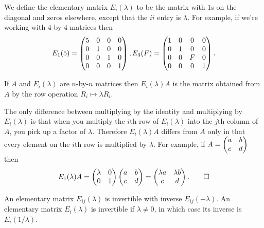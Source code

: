 \documentclass{article}
\begin{document}
\begin{Definition}\label{dfn:elematrix2}
We define the elementary matrix \(E_i(\lambda)\) to be the matrix
with \(1\)s on the diagonal and zeros elsewhere, except that the
\(ii\) entry is \(\lambda\). For example, if we're working with
\(4\)-by-\(4\) matrices then \[E_1(5)=\begin{pmatrix} 5 & 0 & 0 & 0 \\ 0 & 1 & 0
& 0 \\ 0 & 0 & 1 & 0 \\ 0 & 0 & 0 & 1\end{pmatrix}, E_3(F)=\begin{pmatrix} 1 & 0 & 0 & 0
\\ 0 & 1 & 0 & 0 \\ 0 & 0 & F & 0 \\ 0 & 0 & 0 & 1\end{pmatrix}.\]


\end{Definition}
\begin{Lemma}
If \(A\) and \(E_i(\lambda)\) are \(n\)-by-\(n\) matrices then
\(E_i(\lambda)A\) is the matrix obtained from \(A\) by the row
operation \(R_i\mapsto\lambda R_i\).
\end{Lemma}
\begin{Proof}
The only difference between multiplying by the identity and
multiplying by \(E_i(\lambda)\) is that when you multiply the
\(i\)th row of \(E_i(\lambda)\) into the \(j\)th column of \(A\),
you pick up a factor of \(\lambda\). Therefore \(E_i(\lambda)A\)
differs from \(A\) only in that every element on the \(i\)th row is
multiplied by \(\lambda\). For example, if \(A=\begin{pmatrix} a & b \\ c &
d\end{pmatrix}\) then \[E_1(\lambda)A=\begin{pmatrix} \lambda & 0 \\ 0 & 1 \end{pmatrix}\begin{pmatrix} a & b
\\ c & d\end{pmatrix}=\begin{pmatrix} \lambda a & \lambda b \\ c & d\end{pmatrix}.\qedhere\]


\end{Proof}
\begin{Lemma}
An elementary matrix \(E_{ij}(\lambda)\) is invertible with inverse
\(E_{ij}(-\lambda)\). An elementary matrix \(E_i(\lambda)\) is
invertible if \(\lambda\neq 0\), in which case its inverse is
\(E_i(1/\lambda)\).
\end{Lemma}
\end{document}
